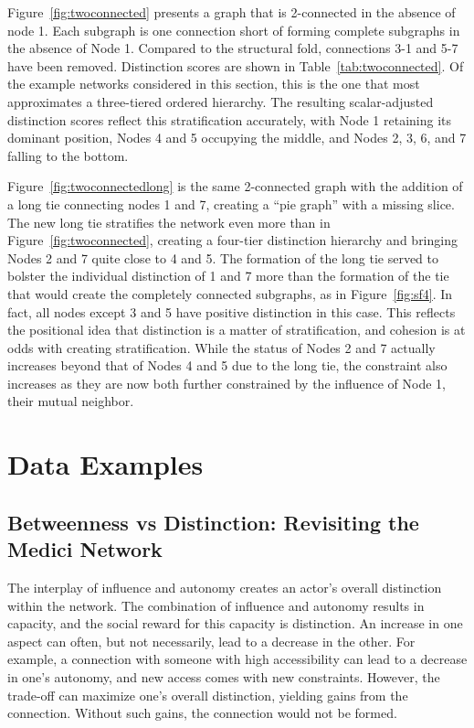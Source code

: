 \documentclass[12pt]{article}
\begin{document}
Figure~\ref{fig:twoconnected} presents a graph that is 2-connected in the absence of node 1. Each subgraph is one connection short of forming complete subgraphs in the absence of Node 1. Compared to the structural fold, connections 3-1 and 5-7 have been removed. Distinction scores are shown in Table~\ref{tab:twoconnected}. Of the example networks considered in this section, this is the one that most approximates a three-tiered ordered hierarchy. The resulting scalar-adjusted distinction scores reflect this stratification accurately, with Node 1 retaining its dominant position, Nodes 4 and 5 occupying the middle, and Nodes 2, 3, 6, and 7 falling to the bottom. 

Figure~\ref{fig:twoconnectedlong} is the same 2-connected graph with the addition of a long tie connecting nodes 1 and 7, creating a ``pie graph'' with a missing slice. The new long tie stratifies the network even more than in Figure~\ref{fig:twoconnected}, creating a four-tier distinction hierarchy and bringing Nodes 2 and 7 quite close to 4 and 5. The formation of the long tie served to bolster the individual distinction of 1 and 7 more than the formation of the tie that would create the completely connected subgraphs, as in Figure~\ref{fig:sf4}. In fact, all nodes except 3 and 5 have positive distinction in this case. This reflects the positional idea that distinction is a matter of stratification, and cohesion is at odds with creating stratification. While the status of Nodes 2 and 7 actually increases beyond that of Nodes 4 and 5 due to the long tie, the constraint also increases as they are now both further constrained by the influence of Node 1, their mutual neighbor.  

\section{Data Examples}
\subsection{Betweenness vs Distinction: Revisiting the Medici Network}
The interplay of influence and autonomy creates an actor’s overall distinction within the network. The combination of influence and autonomy results in capacity, and the social reward for this capacity is distinction. An increase in one aspect can often, but not necessarily, lead to a decrease in the other. For example, a connection with someone with high accessibility can lead to a decrease in one’s autonomy, and new access comes with new constraints. However, the trade-off can maximize one’s overall distinction, yielding gains from the connection. Without such gains, the connection would not be formed.
\end{document}
